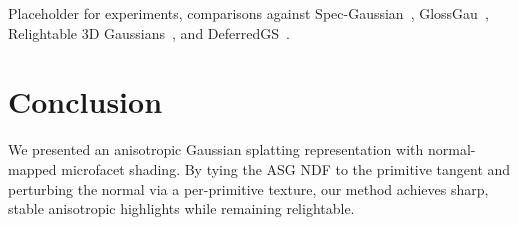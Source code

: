 \documentclass[acmtog, review=true, authorversion=false]{acmart}
\begin{document}
Placeholder for experiments, comparisons against
Spec-Gaussian~\cite{specgaussian}, GlossGau~\cite{glossgau},
Relightable 3D Gaussians~\cite{relightable3dgaussians}, and
DeferredGS~\cite{deferredgs}.

\section{Conclusion}\label{sec:conclusion}

We presented an anisotropic Gaussian splatting representation with
normal-mapped microfacet shading. By tying the ASG NDF to the
primitive tangent and perturbing the normal via a per-primitive
texture, our method achieves sharp, stable anisotropic highlights
while remaining relightable.



\end{document}
